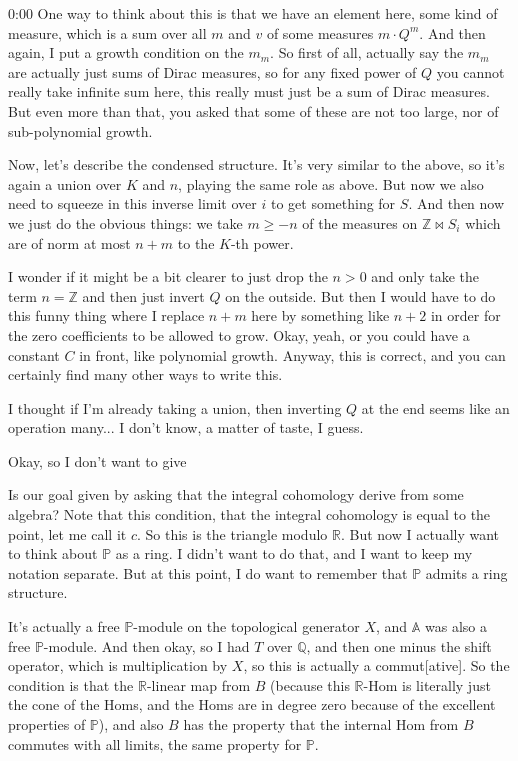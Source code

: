 \begin{unfinished}{0:00}
One way to think about this is that we have an element here, some kind of measure, which is a sum over all $m$ and $v$ of some measures $m \cdot Q^m$. And then again, I put a growth condition on the $m_m$. So first of all, actually say the $m_m$ are actually just sums of Dirac measures, so for any fixed power of $Q$ you cannot really take infinite sum here, this really must just be a sum of Dirac measures. But even more than that, you asked that some of these are not too large, nor of sub-polynomial growth.

Now, let's describe the condensed structure. It's very similar to the above, so it's again a union over $K$ and $n$, playing the same role as above. But now we also need to squeeze in this inverse limit over $i$ to get something for $S$. And then now we just do the obvious things: we take $m \geq -n$ of the measures on $\mathbb{Z} \Join S_i$ which are of norm at most $n + m$ to the $K$-th power.

I wonder if it might be a bit clearer to just drop the $n > 0$ and only take the term $n = \mathbb{Z}$ and then just invert $Q$ on the outside. But then I would have to do this funny thing where I replace $n + m$ here by something like $n + 2$ in order for the zero coefficients to be allowed to grow. Okay, yeah, or you could have a constant $C$ in front, like polynomial growth. Anyway, this is correct, and you can certainly find many other ways to write this.

I thought if I'm already taking a union, then inverting $Q$ at the end seems like an operation many... I don't know, a matter of taste, I guess.

Okay, so I don't want to give

Is our goal given by asking that the integral cohomology derive from some algebra? Note that this condition, that the integral cohomology is equal to the point, let me call it $c$. So this is the triangle modulo $\mathbb{R}$. But now I actually want to think about $\mathbb{P}$ as a ring. I didn't want to do that, and I want to keep my notation separate. But at this point, I do want to remember that $\mathbb{P}$ admits a ring structure.

It's actually a free $\mathbb{P}$-module on the topological generator $X$, and $\mathbb{A}$ was also a free $\mathbb{P}$-module. And then okay, so I had $T$ over $\mathbb{Q}$, and then one minus the shift operator, which is multiplication by $X$, so this is actually a commut[ative]. So the condition is that the $\mathbb{R}$-linear map from $B$ (because this $\mathbb{R}$-Hom is literally just the cone of the Homs, and the Homs are in degree zero because of the excellent properties of $\mathbb{P}$), and also $B$ has the property that the internal Hom from $B$ commutes with all limits, the same property for $\mathbb{P}$.


\end{unfinished}

